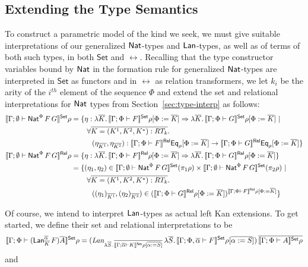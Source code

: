 \documentclass{lmcs}
\theoremstyle{plain}\newtheorem{satz}[thm]{Satz}
\newcommand{\set}{\mathsf{Set}}
\begin{document}
{\subsection{Extending the Type Semantics}

To construct a parametric model of the kind we seek, we must give
suitable interpretations of our generalized $\mathsf{Nat}$-types and
$\mathsf{Lan}$-types, as well as of terms of both such types, in both $\set$
and $\rel$. Recalling that the type constructor variables bound by
$\mathsf{Nat}$ in the formation rule for generalized $\mathsf{Nat}$-types are
interpreted in $\set$ as functors and in $\rel$ as relation
transformers, we let $k_i$ be the arity of the $i^{th}$ element of the
sequence $\Phi$ and extend the set and relational interpretations for
$\mathsf{Nat}$ types from Section~\ref{sec:type-interp} as follows:
\begin{align*}
\setsem{\Gamma; \emptyset \vdash \Nat^\Phi\,F\,G}\rho
&= \{\eta : \lambda \ol{K}. \,\setsem{\Gamma; \Phi \vdash F}\rho[\Phi := \ol{K}] 
  \Rightarrow \lambda \ol{K}.\,\setsem{\Gamma; \Phi \vdash G}\rho[\Phi := \ol{K}]~|~\\ 
&\hspace{0.3in} \forall \ol{K = (K^1, K^2, K^*) : RT_k}.\\
&\hspace{0.4in} (\eta_{\overline{K^1}}, \eta_{\overline{K^2}})
: \relsem{\Gamma; \Phi \vdash F}\Eq_{\rho}[\Phi := \ol{K}]
\rightarrow \relsem{\Gamma; \Phi \vdash G}\Eq_{\rho}[\Phi := \ol{K}] \} \\
\relsem{\Gamma; \emptyset \vdash \Nat^\Phi \,F\,G}\rho
&= \{\eta : \lambda \ol{K}.\,\relsem{\Gamma; \Phi \vdash F}\rho[\Phi := \ol{K}]
\Rightarrow \lambda \ol{K}. \,\relsem{\Gamma; \Phi \vdash G}\rho[\Phi := \ol{K}]\}\\
&=
  \{(\eta_1,\eta_2) \in \setsem{\Gamma; \emptyset
    \vdash \Nat^\Phi
    \,F\,G} (\pi_1 \rho) \times \setsem{ 
    \Gamma;\emptyset
    \vdash \Nat^\Phi \,F\,G} (\pi_2
  \rho)~|~\\
& \hspace{0.3in} \forall \ol{K = (K^1, K^2, K^*) : RT_k}.\\
& \hspace{0.4in} ((\eta_1)_{\ol{K^1}},(\eta_2)_{\ol{K^2}}) \in
  (\relsem{\Gamma; \Phi \vdash G}\rho[\Phi := \ol{K}])^{\relsem{\Gamma;\Phi\vdash F}\rho[\Phi := \ol{K}]} \}\\  
\end{align*}

Of course, we intend to interpret $\mathsf{Lan}$-types as actual left Kan
extensions. To get started, we define their set and relational
interpretations to be
\[
  \setsem{\Gamma;\Phi \vdash
    (\Lan^{\ol{\alpha}}_{\ol{K}}\,F)\ol{A}}\rho = (
  \textit{Lan}_{\lambda \ol{S}.\,\ol{\setsem{\Gamma; \ol\alpha \vdash K}
      \rho[\ol{\alpha := S}]}}\, \lambda \ol{S}.\,\setsem{\Gamma; \Phi, \ol\alpha
    \vdash F} \rho[\ol{\alpha := S}])\, \ol{\setsem{\Gamma; \Phi
      \vdash A}\rho}
\]
and 

}
\end{document}
